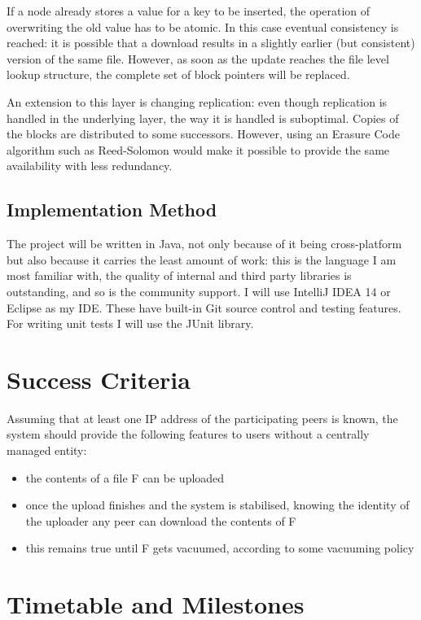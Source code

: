 \documentclass[12pt]{article}
\begin{document}
If a node already stores a value for a key to be inserted, the operation of overwriting the old value has to be atomic. In this case eventual consistency is reached: it is possible that a download results in a slightly earlier (but consistent) version of the same file. However, as soon as the update reaches the file level lookup structure, the complete set of block pointers will be replaced.

An extension to this layer is changing replication: even though replication is handled in the underlying layer, the way it is handled is suboptimal. Copies of the blocks are distributed to some successors. However, using an Erasure Code algorithm such as Reed-Solomon would make it possible to provide the same availability with less redundancy.

\subsection{Implementation Method}

The project will be written in Java, not only because of it being cross-platform but also because it carries the least amount of work: this is the language I am most familiar with, the quality of internal and third party libraries is outstanding, and so is the community support. I will use IntelliJ IDEA 14 or Eclipse as my IDE. These have built-in Git source control and testing features. For writing unit tests I will use the JUnit library.


\section{Success Criteria}

Assuming that at least one IP address of the participating peers is known, the system should provide the following features to users without a centrally managed entity:

\begin{itemize}
\item{the contents of a file F can be uploaded}
\item{once the upload finishes and the system is stabilised, knowing the identity of the uploader any peer can download the contents of F}
\item{this remains true until F gets vacuumed, according to some vacuuming policy}
\end{itemize}

\section{Timetable and Milestones}
\end{document}
